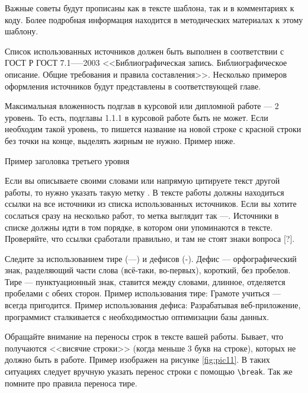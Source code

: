 \documentclass{report}
\begin{document}
Важные советы будут прописаны как в тексте шаблона, так и в комментариях к коду. Более подробная информация находится в методических материалах к этому шаблону.

Список использованных источников должен быть выполнен в соответствии с ГОСТ Р ГОСТ 7.1—--2003 <<Библиографическая запись. Библиографическое описание. Общие требования и правила составления>>. Несколько примеров оформления источников будут представлены в соответствующей главе.

Максимальная вложенность подглав в курсовой или дипломной работе --- 2 уровень. То есть, подглавы 1.1.1 в курсовой работе быть не может. Если необходим такой уровень, то пишется название на новой строке с красной строки без точки на конце, выделять жирным не нужно. Пример ниже.

Пример заголовка третьего уровня

Если вы описываете своими словами или напрямую цитируете текст другой работы, то нужно указать такую метку \cite{bib_gost1}. В тексте работы должны находиться ссылки на все источники из списка использованных источников. Если вы хотите сослаться сразу на несколько работ, то метка выглядит так \cite{bib_gost2}---\cite{bib_electr_res}. Источники в списке должны идти в том порядке, в котором они упоминаются в тексте. Проверяйте, что ссылки сработали правильно, и там не стоят знаки вопроса [?].

Следите за использованием тире (---) и дефисов (-). Дефис — орфографический знак, разделяющий части слова (всё-таки, во-первых), короткий, без пробелов.
Тире — пунктуационный знак, ставится между словами, длинное, отделяется пробелами с обеих сторон. Пример использования тире: Грамоте учиться — всегда пригодится. Пример использования дефиса: Разрабатывая веб-приложение, программист сталкивается с необходимостью оптимизации базы данных.

Обращайте внимание на переносы строк в тексте вашей работы. Бывает, что получаются <<висячие строки>> (когда меньше 3 букв на строке), которых не должно быть в работе. Пример изображен на рисунке \ref{fig:pic11}. В таких ситуациях следует вручную указать перенос строки с помощью \verb|\break|. Так же помните про правила переноса тире.

\end{document}
